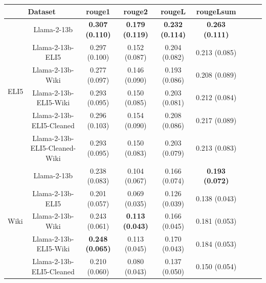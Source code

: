 \documentclass[11pt, oneside]{article}   	%
\begin{document}
%
\begin{table}[ht]
\hspace{-.5in}
\begin{tabular}{lcccccccc}
\toprule
\multicolumn{2}{c}{Dataset} & \multicolumn{1}{c}{rouge1} & \multicolumn{1}{c}{rouge2} & \multicolumn{1}{c}{rougeL} & \multicolumn{1}{c}{rougeLsum} \\
\midrule
\multirow{6}{*}{ELI5} & Llama-2-13b & \textbf{0.307 (0.110)} & \textbf{0.179 (0.119)} & \textbf{0.232 (0.114)} & \textbf{0.263 (0.111)} \\
& Llama-2-13b-ELI5 & 0.297 (0.100) & 0.152 (0.087) & 0.204 (0.082) & 0.213 (0.085) \\
& Llama-2-13b-Wiki & 0.277 (0.097) & 0.146 (0.090) & 0.193 (0.086) & 0.208 (0.089) \\
& Llama-2-13b-ELI5-Wiki & 0.293 (0.095) & 0.150 (0.085) & 0.203 (0.081) & 0.212 (0.084) \\
& Llama-2-13b-ELI5-Cleaned & 0.296 (0.103) & 0.154 (0.090) & 0.208 (0.086) & 0.217 (0.089) \\
& Llama-2-13b-ELI5-Cleaned-Wiki & 0.293 (0.095) & 0.150 (0.083) & 0.203 (0.079) & 0.213 (0.083) \\
\midrule
\multirow{6}{*}{Wiki} & Llama-2-13b & 0.238 (0.083) & 0.104 (0.067) & 0.166 (0.074) & \textbf{0.193 (0.072)} \\
& Llama-2-13b-ELI5 & 0.201 (0.057) & 0.069 (0.035) & 0.126 (0.039) & 0.138 (0.043) \\
& Llama-2-13b-Wiki & 0.243 (0.061) & \textbf{0.113 (0.043)} & 0.166 (0.045) & 0.181 (0.053) \\
& Llama-2-13b-ELI5-Wiki & \textbf{0.248 (0.065)} & 0.113 (0.045) & 0.170 (0.043) & 0.184 (0.053) \\
& Llama-2-13b-ELI5-Cleaned & 0.210 (0.060) & 0.080 (0.043) & 0.137 (0.050) & 0.150 (0.054) \\

\end{tabular}
\end{table}
\end{document}

